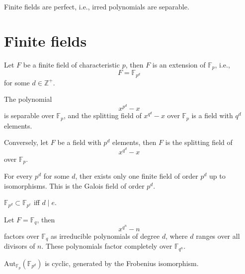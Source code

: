 \documentclass[openany]{book}
\newcommand{\Z}{\mathbb{Z}}
\newcommand{\F}{\mathbb{F}}
\begin{document}
\begin{cor}
    Finite fields are perfect, i.e., irred polynomials are separable.
\end{cor}


\section{Finite fields}
\begin{defn}
    Let $F$ be a finite field of characteristic $p$, then $F$ is an extension of $\F_{p}$, i.e., 
    \begin{equation*}
        F=\F_{p^d}
    \end{equation*}
    for some $d\in\Z^+$.
\end{defn}

\begin{thm}
    The polynomial
    \begin{equation*}
        x^{p^d}-x
    \end{equation*}
    is separable over $\F_p$, and the splitting field of $x^{q^d}-x$ over $\F_p$ is a field with $q^d$ elements. 

    Conversely, let $F$ be a field with $p^d$ elements, then $F$ is the splitting field of 
    \begin{equation*}
        x^{q^d}-x
    \end{equation*}
    over $\F_p$.
\end{thm}


\begin{cor}
    For every $p^d$ for some $d$, ther exists only one finite field of order $p^d$ up to isomorphisms. This is the Galois field of order $p^d$.
\end{cor}



\begin{cor}
    $\F_{p^d}\subset\F_{p^e}$ iff $d\mid e$.
\end{cor}

\begin{cor}
    Let $F=\F_q$, then 
    \begin{equation*}
        x^{q^n}-n
    \end{equation*}
    factors over $\F_q$ as irreducible polynomials of degree $d$, where $d$ ranges over all divisors of $n$. These polynomials factor completely over $\F_{q^n}$.
\end{cor}

\begin{thm}
    $\text{Aut}_{\F_p}(\F_{p^d})$ is cyclic, generated by the Frobenius isomorphism.
\end{thm}
\end{document}
